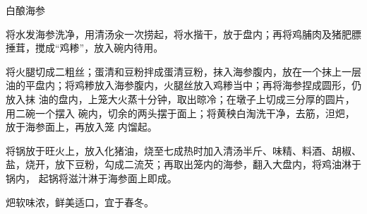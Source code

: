 %
%
%
%
%
%
%
\begin{recipe}[金钱海参]{白酿海参}

\ingredients


\preparation

\step 将水发海参洗净，用清汤汆一次捞起，将水揩干，放于盘内；再将鸡脯肉及猪肥膘
捶茸，搅成“鸡糁”，放入碗内待用。

\step 将火腿切成二粗丝；蛋清和豆粉拌成蛋清豆粉，抹入海参腹内，放在一个抹上一层
油的平盘内；将鸡糁放入海参腹内，火腿丝放入鸡糁当中；再将海参捏成圆形，仍放入抹
油的盘内，上笼大火蒸十分钟，取出晾冷；在墩子上切成三分厚的圆片，用二碗一个摆入
碗内，切余的两头摆于面上；将黄秧白淘洗干净，去筋，泹𤆵，放于海参面上，再放入笼
内馏起。

\step 将锅放于旺火上，放入化猪油，烧至七成热时加入清汤半斤、味精、料酒、胡椒、
盐，烧开，放下豆粉，勾成二流芡；再取出笼内的海参，翻入大盘内，将鸡油淋于锅内，
起锅将滋汁淋于海参面上即成。

\features

𤆵软味浓，鲜美适口，宜于春冬。

\end{recipe}

